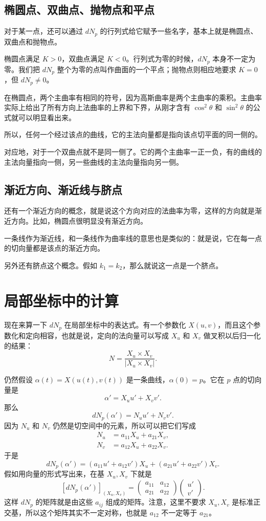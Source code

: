 \documentclass[UTF8,11pt,a4paper]{ctexart}
\begin{document}
\subsection{椭圆点、双曲点、抛物点和平点}

对于某一点，还可以通过 $dN_p$ 的行列式给它赋予一些名字，基本上就是椭圆点、双曲点和抛物点。

椭圆点满足 $K>0$，双曲点满足 $K<0$。行列式为零的时候，$dN_p$ 本身不一定为零。我们把 $dN_p$ 整个为零的点叫作曲面的一个平点；抛物点则相应地要求 $K=0$，但 $dN_p\ne0$。

在椭圆点，两个主曲率有相同的符号，因为高斯曲率是两个主曲率的乘积。主曲率实际上给出了所有方向上法曲率的上界和下界，从刚才含有 $\cos^2\theta$ 和 $\sin^2\theta$ 的公式就可以明显看出来。

所以，任何一个经过该点的曲线，它的主法向量都是指向该点切平面的同一侧的。

对应地，对于一个双曲点就不是同一侧了。它的两个主曲率一正一负，有的曲线的主法向量指向一侧，另一些曲线的主法向量指向另一侧。

\subsection{渐近方向、渐近线与脐点}

还有一个渐近方向的概念，就是说这个方向对应的法曲率为零，这样的方向就是渐近方向。比如，椭圆点很明显没有渐近方向。

一条线作为渐近线，和一条线作为曲率线的意思也是类似的：就是说，它在每一点的切向量都是该点的渐近方向。

另外还有脐点这个概念。假如 $k_1=k_2$，那么就说这一点是一个脐点。

\section{局部坐标中的计算}

现在来算一下 $dN_p$ 在局部坐标中的表达式。有一个参数化 $X(u,v)$，而且这个参数化和定向相容，也就是说，定向的法向量可以写成 $X_u$ 和 $X_v$ 做叉积以后归一化的结果：
\[
N=\frac{X_u\times X_v}{|X_u\times X_v|}.
\]

仍然假设 $\alpha(t)=X(u(t),v(t))$ 是一条曲线，$\alpha(0)=p$。它在 $p$ 点的切向量是
\[
\alpha'=X_u u'+X_v v'.
\]
那么
\[
dN_p(\alpha')=N_u u'+N_v v'.
\]
因为 $N_u$ 和 $N_v$ 仍然是切空间中的元素，所以可以把它们写成
\[
\begin{aligned}
N_u&=a_{11}X_u+a_{21}X_v,\\
N_v&=a_{12}X_u+a_{22}X_v.
\end{aligned}
\]
于是
\[
dN_p(\alpha')
=(a_{11}u'+a_{12}v')X_u
+(a_{21}u'+a_{22}v')X_v.
\]
假如用向量的形式写出来，在基 $X_u,X_v$ 下就是
\[
[dN_p(\alpha')]_{(X_u,X_v)}
=\begin{pmatrix}a_{11}&a_{12}\\a_{21}&a_{22}\end{pmatrix}
\begin{pmatrix}u'\\v'\end{pmatrix}.
\]
这样 $dN_p$ 的矩阵就是由这些 $a_{ij}$ 组成的矩阵。注意，这里不要求 $X_u,X_v$ 是标准正交基，所以这个矩阵其实不一定对称，也就是 $a_{12}$ 不一定等于 $a_{21}$。
\end{document}
